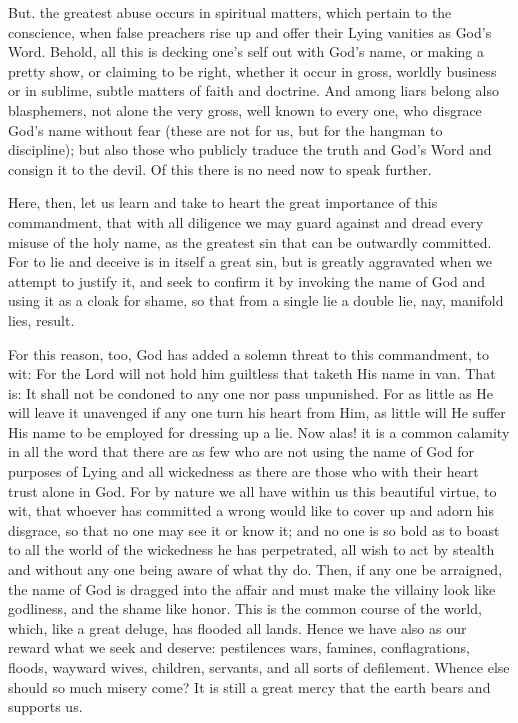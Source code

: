 But. the greatest abuse occurs in spiritual matters, which pertain to
the conscience, when false preachers rise up and offer their Lying
vanities as God's Word. Behold, all this is decking one's self out with
God's name, or making a pretty show, or claiming to be right, whether
it occur in gross, worldly business or in sublime, subtle matters of
faith and doctrine. And among liars belong also blasphemers, not alone
the very gross, well known to every one, who disgrace God's name
without fear (these are not for us, but for the hangman to discipline);
but also those who publicly traduce the truth and God's Word and
consign it to the devil. Of this there is no need now to speak further.


Here, then, let us learn and take to heart the great importance of this
commandment, that with all diligence we may guard against and dread
every misuse of the holy name, as the greatest sin that can be
outwardly committed. For to lie and deceive is in itself a great sin,
but is greatly aggravated when we attempt to justify it, and seek to
confirm it by invoking the name of God and using it as a cloak for
shame, so that from a single lie a double lie, nay, manifold lies,
result.

For this reason, too, God has added a solemn threat to this
commandment, to wit: For the Lord will not hold him guiltless that
taketh His name in van. That is: It shall not be condoned to any one
nor pass unpunished. For as little as He will leave it unavenged if any
one turn his heart from Him, as little will He suffer His name to be
employed for dressing up a lie. Now alas! it is a common calamity in
all the word that there are as few who are not using the name of God
for purposes of Lying and all wickedness as there are those who with
their heart trust alone in God. For by nature we all have within us
this beautiful virtue, to wit, that whoever has committed a wrong would
like to cover up and adorn his disgrace, so that no one may see it or
know it; and no one is so bold as to boast to all the world of the
wickedness he has perpetrated, all wish to act by stealth and without
any one being aware of what thy do. Then, if any one be arraigned, the
name of God is dragged into the affair and must make the villainy look
like godliness, and the shame like honor. This is the common course of
the world, which, like a great deluge, has flooded all lands. Hence we
have also as our reward what we seek and deserve: pestilences wars,
famines, conflagrations, floods, wayward wives, children, servants, and
all sorts of defilement. Whence else should so much misery come? It is
still a great mercy that the earth bears and supports us.

